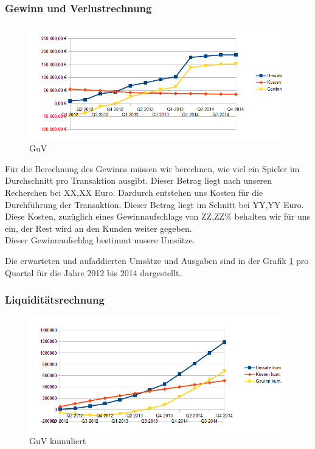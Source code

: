 \subsubsection*{Gewinn und Verlustrechnung}
\begin{figure}[htbp]
	\centering
	\includegraphics[width=1\textwidth]{geschaeftsplan/GuV.png} 
	\caption{GuV}
	\label{picGuV}
\end{figure}
Für die Berechnung des Gewinns müssen wir berechnen, wie viel ein Spieler im Durchschnitt pro Transaktion ausgibt. Dieser Betrag liegt nach unseren Recherchen bei XX,XX Euro. Dardurch entstehen uns Kosten für die Durchführung der Transaktion. Dieser Betrag liegt im Schnitt bei YY,YY Euro. Diese Kosten, zuzüglich eines Gewinnaufschlags von ZZ,ZZ\% behalten wir für uns ein, der Rest wird an den Kunden weiter gegeben.\\
Dieser Gewinnaufschlag bestimmt unsere Umsätze.

Die erwarteten und aufaddierten Umsätze und Ausgaben sind in der Grafik \ref{picGuV} pro Quartal für die Jahre 2012 bis 2014 dargestellt.

\subsubsection*{Liquiditätsrechnung}
\begin{figure}[htbp]
	\centering
	\includegraphics[width=1\textwidth]{geschaeftsplan/GuVkummuliert.png}
	\caption{GuV kumuliert}
	\label{picGuVkum}
\end{figure}

